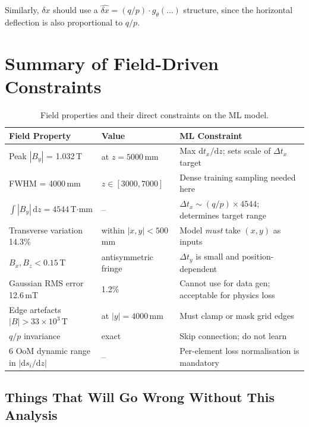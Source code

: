 \documentclass[11pt,a4paper]{article}
\begin{document}
Similarly, $\delta x$ should use a
$\widehat{\delta x} = (q/p) \cdot g_\theta(\ldots)$ structure, since
the horizontal deflection is also proportional to $q/p$.

\section{Summary of Field-Driven Constraints}
\label{sec:summary}

\begin{table}[ht]
\centering
\caption{Field properties and their direct constraints on the ML model.}
\label{tab:summary}
\renewcommand{\arraystretch}{1.15}
\begin{tabular}{p{4.5cm}lp{5.5cm}}
\toprule
\textbf{Field Property} & \textbf{Value} & \textbf{ML Constraint} \\
\midrule
Peak $|B_y|$ = 1.032\,T & at $z = 5000$\,mm &
  Max $\mathrm{d}t_x/\mathrm{d}z$; sets scale of $\Delta t_x$ target \\
FWHM = 4000\,mm & $z \in [3000, 7000]$ &
  Dense training sampling needed here \\
$\int |B_y|\,\mathrm{d}z = 4544$\,T$\cdot$mm & -- &
  $\Delta t_x \sim (q/p) \times 4544$; determines target range \\
Transverse variation 14.3\% & within $|x,y| < 500$\,mm &
  Model \emph{must} take $(x,y)$ as inputs \\
$B_x, B_z < 0.15$\,T & antisymmetric fringe &
  $\Delta t_y$ is small and position-dependent \\
Gaussian RMS error 12.6\,mT & 1.2\% &
  Cannot use for data gen; acceptable for physics loss \\
Edge artefacts $|B| > 33\times10^3$\,T & at $|y| = 4000$\,mm &
  Must clamp or mask grid edges \\
$q/p$ invariance & exact &
  Skip connection; do not learn \\
6 OoM dynamic range in $|\mathrm{d}s_i/\mathrm{d}z|$ & -- &
  Per-element loss normalisation is mandatory \\
\bottomrule
\end{tabular}
\end{table}

\subsection{Things That Will Go Wrong Without This Analysis}
\end{document}
